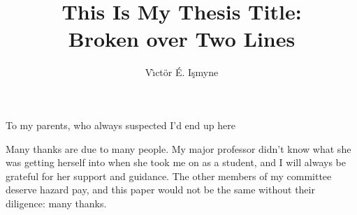 \documentclass[11pt]{fsuthesis}
\title{This Is My Thesis Title:\protect\\Broken over Two Lines}
\author{V\`\i ct\"or \'E. I\c smyne}  %
\begin{document}
\frontmatter          %
\maketitle            %
\makecommitteepage    %


\begin{dedication}
\centering
To my parents, who always suspected I'd end up here
\end{dedication}


\begin{acknowledgments}
Many thanks are due to many people.  My major professor didn't
know what she was getting herself into when she took me on as
a student, and I will always be grateful for her support and
guidance.  The other members of my committee deserve hazard pay,
and this paper would not be the same without their diligence:
many thanks.
\end{acknowledgments}


\tableofcontents
\listoftables
\listoffigures

\end{document}
